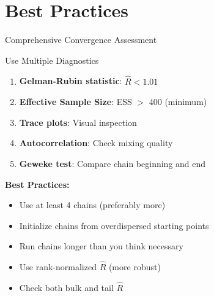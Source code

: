 \documentclass[aspectratio=169]{beamer}
\begin{document}
\section{Best Practices}

\begin{frame}{Comprehensive Convergence Assessment}
	\begin{block}{Use Multiple Diagnostics}
		\begin{enumerate}
			\item \textbf{Gelman-Rubin statistic}: $\hat{R} < 1.01$
			\item \textbf{Effective Sample Size}: ESS $>$ 400 (minimum)
			\item \textbf{Trace plots}: Visual inspection
			\item \textbf{Autocorrelation}: Check mixing quality
			\item \textbf{Geweke test}: Compare chain beginning and end
		\end{enumerate}
	\end{block}

	\vspace{0.5cm}
	\textbf{Best Practices:}
	\begin{itemize}
		\item Use at least 4 chains (preferably more)
		\item Initialize chains from overdispersed starting points
		\item Run chains longer than you think necessary
		\item Use rank-normalized $\hat{R}$ (more robust)
		\item Check both bulk and tail $\hat{R}$
	\end{itemize}
\end{frame}
\end{document}
